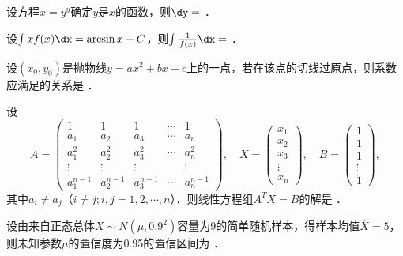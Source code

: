 \documentclass[plain,noanswer,medmath]{../../template/jnuexam}
\begin{document}




\begin{problem}
设方程$x = y^y$确定$y$是$x$的函数，则$\dy =$ \fillin{}．
\end{problem}


\begin{problem}
设$\int x f(x)\dx = \arcsin x + C$，则$\int \frac{1}{f(x)} \dx =$ \fillin{}．
\end{problem}


\begin{problem}
设$\left(x_0,y_0 \right)$是抛物线$y = ax^2 + bx + c$上的一点，若在该点的切线过原点，则系数应满足的关系是 \fillin{}．
\end{problem}


\begin{problem}
设
$$A = \begin{pmatrix}
            1 &           1 &           1 & \cdots & 1 \\
          a_1 &         a_2 &         a_3 & \cdots & a_n \\
        a_1^2 &       a_2^2 &       a_3^2 & \cdots & a_n^2 \\
       \vdots &      \vdots &      \vdots &        & \vdots \\
  a_1^{n - 1} & a_2^{n - 1} & a_3^{n - 1} & \cdots & a_n^{n - 1}
\end{pmatrix},\quad X = \begin{pmatrix}
  x_1 \\
  x_2 \\
  x_3 \\
  \vdots \\
  x_n
\end{pmatrix},\quad B = \begin{pmatrix}
  1 \\
  1 \\
  1 \\
  \vdots \\
  1
\end{pmatrix},$$
其中$a_i \ne a_j$（$i \ne j;i,j = 1,2, \cdots ,n$）．则线性方程组$A^T X = B$的解是 \fillin{}．
\end{problem}


\begin{problem}
设由来自正态总体$X\sim N(\mu ,0.9^2)$容量为9的简单随机样本，得样本均值$\overline{X}= 5$，
则未知参数$\mu$的置信度为0.95的置信区间为 \fillin{}．
\end{problem}
\end{document}
